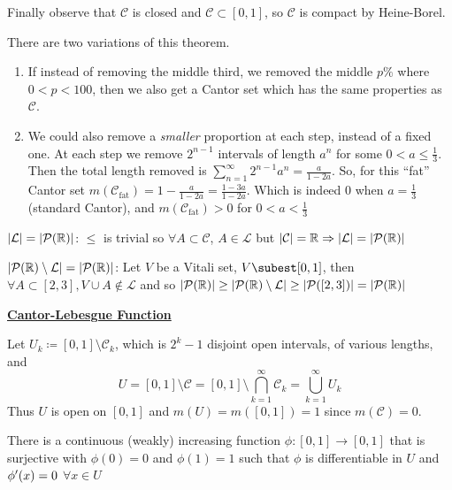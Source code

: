 Finally observe that $\mathcal{C}$ is closed and $\mathcal{C} \subset [0,1]$, so $\mathcal{C}$ is compact by Heine-Borel.

There are two variations of this theorem.
\begin{enumerate}
    \item If instead of removing the middle third, we removed the middle $p\%$ where $0 < p < 100$, then we also get a Cantor set which has the same properties as $\mathcal{C}$.
    \item We could also remove a \emph{smaller} proportion at each step, instead of a fixed one.
    At each step we remove $2^{n-1}$ intervals of length $a^n$ for some $0 < a \leq \frac{1}{3}$.
    Then the total length removed is $\sum_{n=1}^{\infty} 2^{n-1} a^n = \frac{a}{1-2a}$.
    So, for this ``fat'' Cantor set $m(\mathcal{C}_{\text{fat}}) = 1 - \frac{a}{1-2a} = \frac{1 - 3a}{1-2a}$.
    Which is indeed 0 when $a = \frac{1}{3}$ (standard Cantor), and $m(\mathcal{C}_{\text{fat}}) > 0$ for $0 < a < \frac{1}{3}$
\end{enumerate}

\begin{remark}
    $\lvert\mathcal{L}\rvert = \lvert\mathcal{P}(\mathbb{R})\rvert$: $\leq$ is trivial so $\forall A \subset \mathcal{C}$, $A \in \mathcal{L}$ but $\lvert\mathcal{C}\rvert = \mathbb{R} \Rightarrow \lvert\mathcal{L}\rvert = \lvert\mathcal{P}(\mathbb{R})\rvert$
\end{remark}

\begin{remark}
    $\lvert\mathcal{P}(\mathbb{R}) \setminus \mathcal{L}\rvert = \lvert\mathcal{P}(\mathbb{R})\rvert$: Let $V$ be a Vitali set, $V \subest [0,1]$, then $\forall A \subset [2,3], V \cup A \notin \mathcal{L}$ and so $\lvert\mathcal{P}(\mathbb{R})\rvert \geq \lvert\mathcal{P}(\mathbb{R}) \setminus \mathcal{L}\rvert \geq \lvert\mathcal{P}([2,3])\rvert = \lvert\mathcal{P}(\mathbb{R})\rvert $
\end{remark}

\textbf{\underline{Cantor-Lebesgue Function}}

Let $U_k \coloneqq [0,1] \setminus \mathcal{C}_k$, which is $2^k - 1$ disjoint open intervals, of various lengths, and
\[
    U = [0,1] \setminus \mathcal{C} = [0,1] \setminus \bigcap_{k=1}^{\infty} \mathcal{C}_k = \bigcup_{k=1}^{\infty} U_k
\]
Thus $U$ is open on $[0,1]$ and $m(U) = m([0,1]) = 1$ since $m(\mathcal{C}) = 0$.

\begin{theorem}
    There is a continuous (weakly) increasing function $\phi : [0,1] \rightarrow [0,1]$ that is surjective with $\phi(0) = 0$ and $\phi(1) = 1$ such that $\phi$ is differentiable in $U$ and $\phi ^{\prime} (x) = 0$ $\forall x \in U$
\end{theorem}

